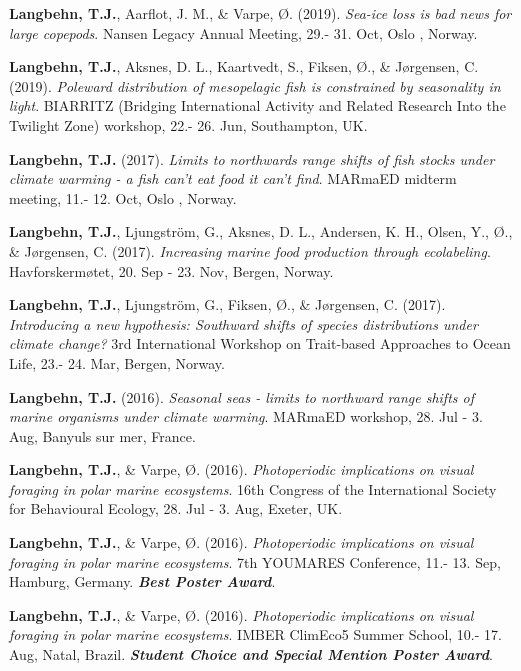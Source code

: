 \documentclass[11pt, a4paper]{awesome-cv}
\begin{document}
\leavevmode\hypertarget{ref-Langbehn11}{}%
\textbf{Langbehn, T.J.}, Aarflot, J. M., \& Varpe, Ø. (2019).
\emph{Sea-ice loss is bad news for large copepods}. Nansen Legacy Annual
Meeting, 29.- 31. Oct, Oslo , Norway.

\leavevmode\hypertarget{ref-Langbehn10}{}%
\textbf{Langbehn, T.J.}, Aksnes, D. L., Kaartvedt, S., Fiksen, Ø., \&
Jørgensen, C. (2019). \emph{Poleward distribution of mesopelagic fish is
constrained by seasonality in light}. BIARRITZ (Bridging International
Activity and Related Research Into the Twilight Zone) workshop, 22.- 26.
Jun, Southampton, UK.

\leavevmode\hypertarget{ref-Langbehn9}{}%
\textbf{Langbehn, T.J.} (2017). \emph{Limits to northwards range shifts
of fish stocks under climate warming - a fish can't eat food it can't
find}. MARmaED midterm meeting, 11.- 12. Oct, Oslo , Norway.

\leavevmode\hypertarget{ref-Langbehn8}{}%
\textbf{Langbehn, T.J.}, Ljungström, G., Aksnes, D. L., Andersen, K. H.,
Olsen, Y., Ø., \& Jørgensen, C. (2017). \emph{Increasing marine food
production through ecolabeling}. Havforskermøtet, 20. Sep - 23. Nov,
Bergen, Norway.

\leavevmode\hypertarget{ref-Langbehn7}{}%
\textbf{Langbehn, T.J.}, Ljungström, G., Fiksen, Ø., \& Jørgensen, C.
(2017). \emph{Introducing a new hypothesis: Southward shifts of species
distributions under climate change?} 3rd International Workshop on
Trait-based Approaches to Ocean Life, 23.- 24. Mar, Bergen, Norway.

\leavevmode\hypertarget{ref-Langbehn3}{}%
\textbf{Langbehn, T.J.} (2016). \emph{Seasonal seas - limits to
northward range shifts of marine organisms under climate warming}.
MARmaED workshop, 28. Jul - 3. Aug, Banyuls sur mer, France.

\leavevmode\hypertarget{ref-Langbehn4}{}%
\textbf{Langbehn, T.J.}, \& Varpe, Ø. (2016). \emph{Photoperiodic
implications on visual foraging in polar marine ecosystems}. 16th
Congress of the International Society for Behavioural Ecology, 28. Jul -
3. Aug, Exeter, UK.

\leavevmode\hypertarget{ref-Langbehn5}{}%
\textbf{Langbehn, T.J.}, \& Varpe, Ø. (2016). \emph{Photoperiodic
implications on visual foraging in polar marine ecosystems}. 7th
YOUMARES Conference, 11.- 13. Sep, Hamburg, Germany. \emph{\textbf{Best
Poster Award}}.

\leavevmode\hypertarget{ref-Langbehn6}{}%
\textbf{Langbehn, T.J.}, \& Varpe, Ø. (2016). \emph{Photoperiodic
implications on visual foraging in polar marine ecosystems}. IMBER
ClimEco5 Summer School, 10.- 17. Aug, Natal, Brazil.
\emph{\textbf{Student Choice and Special Mention Poster Award}}.
\end{document}
